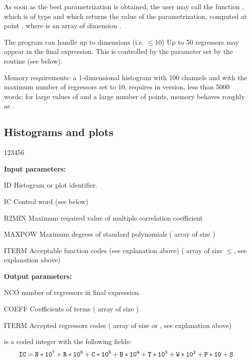 As soon as the best parametrization is obtained, the user may
call the function , which is of type
 and which returns the value of the
parametrization, computed at point , 
where  is an array of dimension .

The program can handle up to  dimensions (i.e. \(\leq 10\))
Up to 50 regressors may appear in the final expression.
This is controlled
by the  parameter set by the routine  (see below).
 
Memory requirements: a 1-dimensional histogram with 100 channels and
with the maximum number of regressors  set to 10, requires in
  version, less than 5000 words;
for large values of  and a large
number of points, memory behaves roughly as
.

\finalnewpage
\subsection*{Histograms and plots}
 
 
\begin{DLtt}{123456}
\item[{\rm\bf Input parameters:}]
\item[ID] Histogram or plot identifier.
\item[IC] Control word (see below)
\item[R2MIN] Maximum required value of multiple correlation coefficient
\item[MAXPOW] Maximum degrees of standard polynomials
( array of size )
\item[ITERM] Acceptable function codes (see explanation above)
( array of size $\leq$, see explanation above)
\item[{\rm\bf Output parameters:}]
\item[NCO] number of regressors in final expression.
\item[COEFF] Coefficients of terms ( array
of size )
\item[ITERM] Accepted regressors codes
( array of size  or , see
explanation above)
\end{DLtt}
 is a coded integer with the following fields:
\begin{displaymath}
\mathtt{IC = N*10\sp7 + R*10\sp6 + C*10\sp5 + B*10\sp4 + T*10\sp3 + W*10\sp2 + P*10 + S}
\end{displaymath}
 
